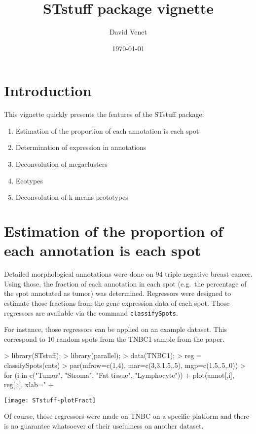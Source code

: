 \documentclass{article}
\title{STstuff package vignette}
\author{David Venet}
\date{\today}
\begin{document}
\maketitle
   
   
\section{Introduction}
This vignette quickly presents the features of the STstuff package:

\begin{enumerate}
\item Estimation of the proportion of each annotation is each spot
\item Determination of expression in annotations
\item Deconvolution of megaclusters
\item Ecotypes
\item Deconvolution of k-means prototypes
\end{enumerate}

\section{Estimation of the proportion of each annotation is each spot}
Detailed morphological annotations were done on 94 triple negative breast cancer. Using those, the fraction of each annotation in each spot (e.g.\ the percentage of the spot annotated as tumor) was determined.
Regressors were designed to estimate those fractions from the gene expression data of each spot. Those regressors are available via the command \verb!classifySpots!.

For instance, those regressors can be applied on an example dataset. This correspond to 10 random spots from the TNBC1 sample from the paper.

\begin{Schunk}
\begin{Sinput}
> library(STstuff);
> library(parallel);
> data(TNBC1);
> reg = classifySpots(cnts)
> par(mfrow=c(1,4), mar=c(3,3,1.5,.5), mgp=c(1.5,.5,.0))
> for (i in c("Tumor", "Stroma", "Fat tissue", "Lymphocyte"))
+ { plot(annot[,i], reg[,i], xlab="% annot", ylab="Estimated fraction", main=i);
+ }
\end{Sinput}
\end{Schunk}
\texttt{[image: STstuff-plotFract]}

Of course, those regressors were made on TNBC on a specific platform and there is no guarantee whatsoever of their usefulness on another dataset.
\end{document}
